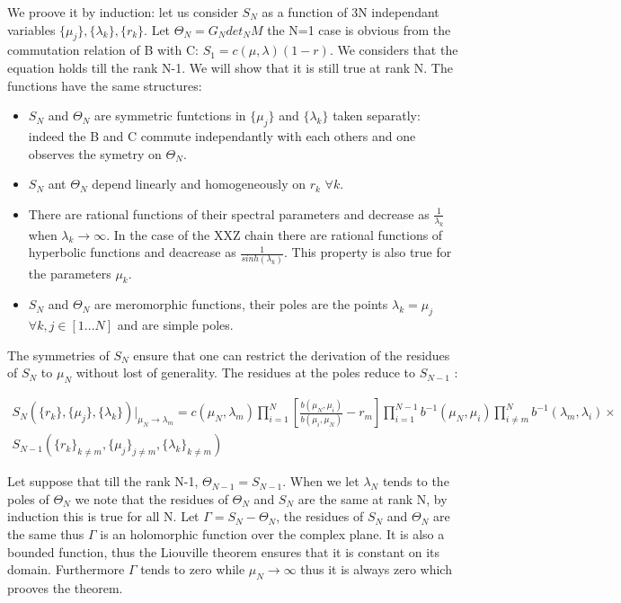 \documentclass[12pt]{article}
\begin{document}
We proove it by induction: let us consider $S_N$ as a function of 3N independant variables $\{\mu_{j}\},\{\lambda_{k}\},\{r_k\}$. Let $\Theta_{N}=G_Ndet_{N}M $ the N=1 case is obvious from the commutation relation of B with C: $S_1=c(\mu,\lambda)(1-r)$. We considers that the equation holds till the rank N-1. We will show that it is still true at rank N. The functions have the same structures:\\
\begin{itemize}
\item $S_N $ and $\Theta_N $ are symmetric funtctions in $\{\mu_j\}$ and $\{\lambda_{k}\}$ taken separatly: indeed the B and C commute independantly with each others and one observes the symetry on $\Theta_N$. 
\item $S_N $ ant $\Theta_N $ depend linearly and homogeneously on $r_k$ $\forall k$. 
\item There are rational functions of their spectral parameters and decrease as $\frac{1}{\lambda_k}$ when $\lambda_k \to \infty $. In the case of the XXZ chain there are rational functions of hyperbolic functions and deacrease as $\frac{1}{sinh(\lambda_k)}$. This property is also true for the parameters $\mu_k$.
\item $S_N $ and $\Theta_N $ are meromorphic functions, their poles are the points $\lambda_k = \mu_j $ 
$ \forall k,j \in [1...N] $ and are simple poles.
\end{itemize}
The symmetries of $S_N$ ensure that one can restrict the derivation of the residues of $S_N $ to $\mu_N $ without lost of generality. The residues at the poles reduce to $S_{N-1}$ \cite{BogIK93L}:

\begin{multline}
S_{N}(\{r_k\},\{\mu_{j}\},\{\lambda_{k}\})|_{\mu_N \to \lambda_m}=c(\mu_N,\lambda_m)\prod_{i=1}^{N}\left[\frac{b(\mu_N,\mu_i)}{b(\mu_i,\mu_N)}-r_m\right]\prod_{i=1}^{N-1} b^{-1}(\mu_N,\mu_i)\prod_{i\neq m}^{N} b^{-1}(\lambda_m,\lambda_i)
\times \\ S_{N-1}(\{r_k\}_{k\neq m},\{\mu_{j}\}_{j \neq m},\{\lambda_{k}\}_{k \neq m})
\end{multline}

Let suppose that till the rank N-1,  $\Theta_{N-1}=S_{N-1}$. When we let $\lambda_N$ tends to the poles of $\Theta_N$ we note that the residues of $\Theta_N$ and $S_N$ are the same at rank N, by induction this is true for all N.
Let  $\Gamma=S_N-\Theta_N$, the residues of $ S_N$ and $\Theta_N$ are the same thus  $\Gamma$ is an holomorphic function over the complex plane. It is also a bounded function, thus the Liouville theorem ensures that it is constant on its domain. Furthermore $\Gamma$ tends to zero while $\mu_N \to \infty$ thus it is always zero which prooves the theorem.
\end{document}
